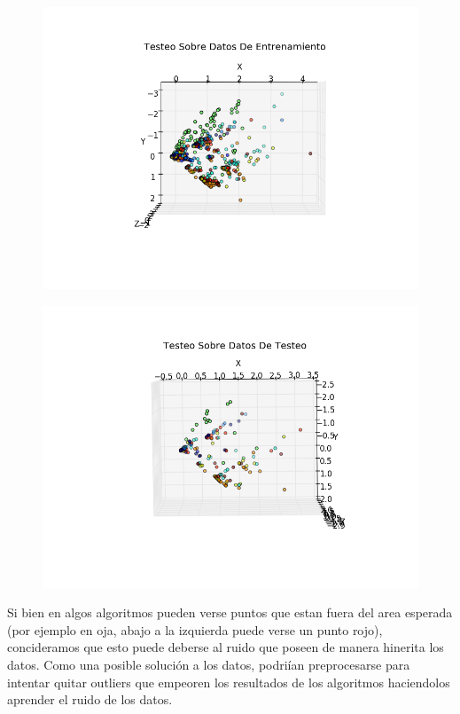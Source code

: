 \begin{figure}[h!]
\hspace{-2cm}\begin{minipage}{.7\textwidth}
  \centering
  \includegraphics[width=.9\linewidth]{testeo_test_set_sanger/entrenamiento12.png}
  \label{fig:test1}
\end{minipage}%
\hspace{-3cm}
\begin{minipage}{.7\textwidth}
  \centering
  \includegraphics[width=.9\linewidth]{testeo_test_set_sanger/test_12.png}
  \label{fig:test2}
\end{minipage}
\end{figure}

Si bien en algos algoritmos pueden verse puntos que estan fuera del area esperada (por ejemplo en oja, abajo a la izquierda puede verse un punto rojo), concideramos que esto puede deberse al ruido que poseen de manera hinerita los datos. Como una posible solución a los datos, podriían preprocesarse para intentar quitar outliers que empeoren los resultados de los algoritmos haciendolos aprender el ruido de los datos.

